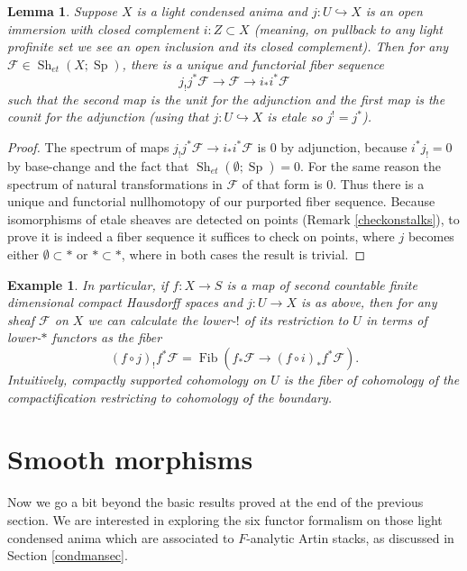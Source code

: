 \documentclass[12pt]{article}
\newtheorem{lemma}[theorem]{Lemma}
\newtheorem{example}[theorem]{Example}
\newcommand{\on}{\operatorname}
\begin{document}
\begin{lemma}
Suppose $X$ is a light condensed anima and $j:U\hookrightarrow X$ is an open immersion with closed complement $i:Z\subset X$ (meaning, on pullback to any light profinite set we see an open inclusion and its closed complement).  Then for any $\mathcal{F}\in\on{Sh}_{et}(X;\on{Sp})$, there is a unique and functorial fiber sequence
$$j_! j^\ast \mathcal{F} \to \mathcal{F} \to i_\ast i^\ast \mathcal{F}$$
such that the second map is the unit for the adjunction and the first map is the counit for the adjunction (using that $j:U\hookrightarrow X$ is etale so $j^!=j^\ast$).
\end{lemma}
\begin{proof}
The spectrum of maps $j_!j^\ast \mathcal{F} \to i_\ast i^\ast \mathcal{F}$ is $0$ by adjunction, because $i^\ast j_!=0$ by base-change and the fact that $\on{Sh}_{et}(\emptyset;\on{Sp})=0$.  For the same reason the spectrum of natural transformations in $\mathcal{F}$ of that form is $0$.  Thus there is a unique and functorial nullhomotopy of our purported fiber sequence.  Because isomorphisms of etale sheaves are detected on points (Remark \ref{checkonstalks}), to prove it is indeed a fiber sequence it suffices to check on points, where $j$ becomes either $\emptyset \subset \ast$ or $\ast\subset \ast$, where in both cases the result is trivial.
\end{proof}

\begin{example}\label{recollement}
In particular, if $f:X\to S$ is a map of second countable finite dimensional compact Hausdorff spaces and $j:U\to X$ is as above, then for any sheaf $\mathcal{F}$ on $X$ we can calculate the lower-$!$ of its restriction to $U$ in terms of lower-$*$ functors as the fiber
$$(f\circ j)_!f^\ast\mathcal{F} = \on{Fib}(f_\ast\mathcal{F} \to (f\circ i)_\ast f^\ast \mathcal{F}).$$
Intuitively, compactly supported cohomology on $U$ is the fiber of cohomology of the compactification restricting to cohomology of the boundary.
\end{example}

\section{Smooth morphisms}\label{smoothsec}

Now we go a bit beyond the basic results proved at the end of the previous section.  We are interested in exploring the six functor formalism on those light condensed anima which are associated to $F$-analytic Artin stacks, as discussed in Section \ref{condmansec}.
\end{document}
